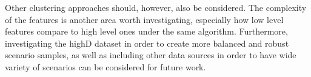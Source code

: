 \documentclass[conference]{IEEEtran}
\begin{document}
Other clustering approaches should, however, also be considered. The complexity of the features is another area worth investigating, especially how low level features compare to high level ones under the same algorithm. Furthermore, investigating the highD dataset in order to create more balanced and robust scenario samples, as well as including other data sources in order to have wide variety of scenarios can be considered for future work.



%
%
%




\end{document}

